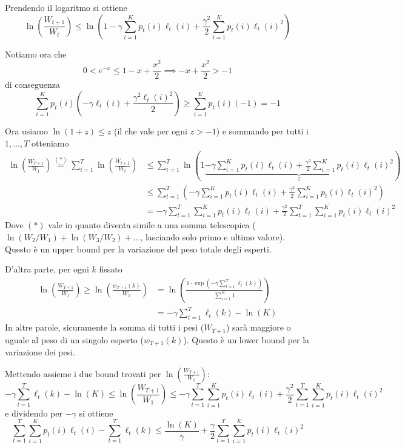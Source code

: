 Prendendo il logaritmo si ottiene
$$ \ln \left(\frac{W_{t+1}}{W_t}\right) \leq \ln \left(1 - \gamma \sum_{i = 1}^K p_t (i) \ell_t (i) + \frac{\gamma^2}{2} \sum_{i = 1}^K p_t (i) \ell_t (i)^2 \right) $$

Notiamo ora che 
$$ 0 < e^{-x} \leq 1 - x + \frac{x^2}{2} \implies - x + \frac{x^2}{2} > -1 $$
di conseguenza
$$ \sum_{i = 1}^K p_t(i) \left(- \gamma \ell_t (i) + \frac{\gamma^2 \ell_t (i)^2}{2} \right) \geq \sum_{i = 1}^K p_t (i) (-1) = -1 $$

Ora usiamo $\ln (1 + z) \leq z$ (il che vale per ogni $z > -1$) e sommando per tutti i $1, \dots, T$ otteniamo
\begin{align*}
	\ln \left(\frac{W_{T+1}}{W_1}\right) \stackrel{(\ast)}{=} \sum_{t = 1}^T \ln \left(\frac{W_{t+1}}{W_t}\right) & \leq \sum_{t = 1}^T \ln \left(1 \underbrace{- \gamma \sum_{i = 1}^K p_t (i) \ell_t (i) + \frac{\gamma^2}{2} \sum_{i = 1}^K p_t (i) \ell_t (i)^2}_{z} \right) \\
	& \leq \sum_{t = 1}^T \left(- \gamma \sum_{i = 1}^K p_t (i) \ell_t (i) + \frac{\gamma^2}{2} \sum_{i = 1}^K p_t (i) \ell_t (i)^2 \right) \\
	& = - \gamma \sum_{t = 1}^T \sum_{i = 1}^K p_t (i) \ell_t (i) + \frac{\gamma^2}{2} \sum_{t = 1}^T \sum_{i = 1}^K p_t (i) \ell_t (i)^2
\end{align*}
Dove $(\ast)$ vale in quanto diventa simile a una somma telescopica ($\ln (W_2/W_1) + \ln (W_3/W_2) + \dots$, lasciando solo primo e ultimo valore). Questo è un upper bound per la variazione del peso totale degli esperti.

D'altra parte, per ogni $k$ fissato
\begin{align*}
	\ln \left(\frac{W_{T+1}}{W_1}\right) \geq \ln \left(\frac{w_{T+1} (k)}{W_1}\right) & = \ln \left(\frac{1 \cdot \exp \left( - \gamma \sum_{t = 1}^T \ell_t (k) \right)}{\sum_{i = 1}^K 1} \right) \\
	& = - \gamma \sum_{t = 1}^T \ell_t (k) - \ln (K) 
\end{align*}
In altre parole, sicuramente la somma di tutti i pesi ($W_{T+1}$) sarà maggiore o uguale al peso di un singolo esperto ($w_{T+1} (k)$). Questo è un lower bound per la variazione dei pesi.

Mettendo assieme i due bound trovati per $\ln \left(\frac{W_{T+1}}{W_1}\right)$:
$$ - \gamma \sum_{t = 1}^T \ell_t (k) - \ln (K) \leq \ln \left(\frac{W_{T+1}}{W_1} \right) \leq - \gamma \sum_{t = 1}^T \sum_{i = 1}^K p_t (i) \ell_t (i) + \frac{\gamma^2}{2} \sum_{t = 1}^T \sum_{i = 1}^K p_t (i) \ell_t (i)^2 $$
e dividendo per $- \gamma$ si ottiene
\[
\sum_{t = 1}^T \sum_{i = 1}^K p_t (i) \ell_t (i)  - \sum_{t = 1}^T \ell_t (k) \leq \frac{\ln (K)}{\gamma} + \frac{\gamma}{2} \sum_{t = 1}^T \sum_{i = 1}^K p_t (i) \ell_t (i)^2 \tag*{$(\dag)$}
\]

